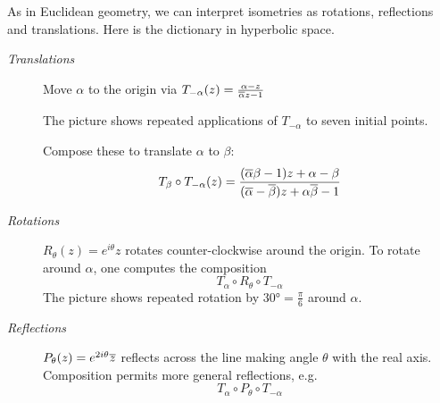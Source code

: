 
As in Euclidean geometry, we can interpret isometries as rotations, reflections and translations. Here is the dictionary in hyperbolic space.\par

\begin{minipage}[t]{0.75\linewidth}\vspace{-3pt}
	\begin{description}
		\item[\normalfont\emph{Translations}] Move $\alpha$ to the origin via $T_{-\alpha}(z)=\frac{\alpha-z}{\overline{\alpha} z-1}$\par
		The picture shows repeated applications of $T_{-\alpha}$ to seven initial points.\par
	Compose these to translate $\alpha$ to $\beta$:
		\[
			T_{\beta}\circ T_{-\alpha}(z)=\frac{(\overline{\alpha}\beta-1)z+\alpha-\beta}{(\overline{\alpha}-\overline{\beta})z+\alpha\overline{\beta}-1}
		\]
	
		\item[\normalfont\emph{Rotations}] $R_\theta(z)=e^{i\theta}z$ rotates counter-clockwise around the origin. To rotate around $\alpha$, one computes the composition
		\[
			T_{\alpha}\circ R_\theta\circ T_{-\alpha}
		\]
		The picture shows repeated rotation by $\ang{30}=\frac\pi 6$ around $\alpha$.
	
		\item[\normalfont\emph{Reflections}] $P_\theta(z)=e^{2i\theta}\overline{z}$ reflects across the line making angle $\theta$ with the real axis. Composition permits more general reflections, e.g.
		\[
			T_{\alpha}\circ P_\theta\circ T_{-\alpha}
		\]
	\end{description}
\end{minipage}
\hfill
